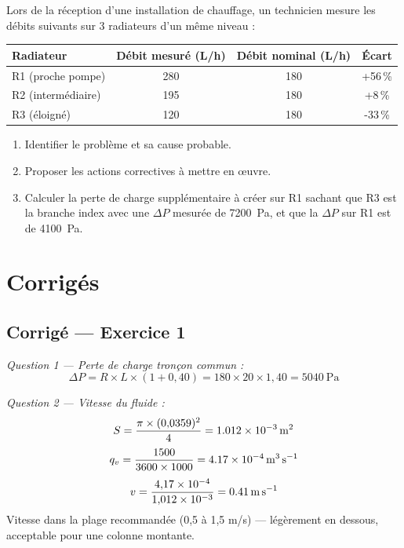 

Lors de la réception d'une installation de chauffage, un technicien mesure les débits suivants sur 3 radiateurs d'un même niveau :

\begin{center}
\begin{tabular}{lccc}
  \toprule
  Radiateur & Débit mesuré (L/h) & Débit nominal (L/h) & Écart \\
  \midrule
  R1 (proche pompe) & 280 & 180 & +56\,\% \\
  R2 (intermédiaire) & 195 & 180 & +8\,\% \\
  R3 (éloigné) & 120 & 180 & -33\,\% \\
  \bottomrule
\end{tabular}
\end{center}

\begin{enumerate}
  \item Identifier le problème et sa cause probable.
  \item Proposer les actions correctives à mettre en œuvre.
  \item Calculer la perte de charge supplémentaire à créer sur R1 sachant que R3 est la branche index avec une $\Delta P$ mesurée de \SI{7200}{\pascal}, et que la $\Delta P$ sur R1 est de \SI{4100}{\pascal}.
\end{enumerate}

\newpage
\section*{Corrigés}

\subsection*{Corrigé — Exercice 1}

\textit{Question 1 — Perte de charge tronçon commun :}
\[
  \Delta P = R \times L \times (1 + 0{,}40) = 180 \times 20 \times 1{,}40 = \SI{5040}{\pascal}
\]

\textit{Question 2 — Vitesse du fluide :}
\[
  S = \frac{\pi \times (0{,}0359)^2}{4} = \SI{1{,}012e-3}{\square\metre}
\]
\[
  q_v = \frac{1500}{3600 \times 1000} = \SI{4{,}17e-4}{\cubic\metre\per\second}
\]
\[
  v = \frac{4{,}17 \times 10^{-4}}{1{,}012 \times 10^{-3}} = \SI{0{,}41}{\metre\per\second}
\]
Vitesse dans la plage recommandée (0,5 à 1,5 m/s) — légèrement en dessous, acceptable pour une colonne montante.


